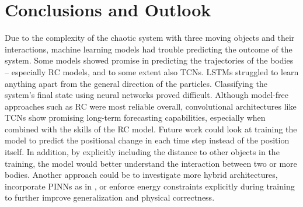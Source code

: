 \documentclass[%
 reprint,
 amsmath,amssymb,
 aps,
]{revtex4-2}
\begin{document}

\section{\label{sec:conclusion}Conclusions and Outlook} %


Due to the complexity of the chaotic system with three moving objects and their interactions, machine learning models had trouble predicting the outcome of the system. 
Some models showed promise in predicting the trajectories of the bodies -- especially RC models, and to some extent also TCNs. LSTMs struggled to learn anything apart from the general direction of the particles. Classifying the system’s final state using neural networks proved difficult.
Although model-free approaches such as RC were most reliable overall, convolutional architectures like TCNs show promising long-term forecasting capabilities, especially when combined with the skills of the RC model. Future work could look at training the model to predict the positional change in each time step instead of the position itself. In addition, by explicitly including the distance to other objects in the training, the model would better understand the interaction between two or more bodies. Another approach could be to investigate more hybrid architectures, incorporate PINNs as in \cite{RAISSI2019686}, or enforce energy constraints explicitly during training to further improve generalization and physical correctness. 
\end{document}
